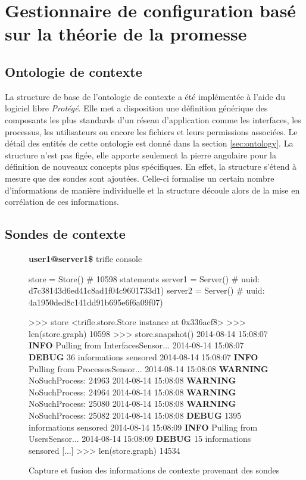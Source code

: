 \section{Gestionnaire de configuration basé sur la théorie de la promesse}

\subsection{Ontologie de contexte}

La structure de base de l'ontologie de contexte a été implémentée à l'aide du
logiciel libre \emph{Protégé}. Elle met a disposition une définition générique
des composants les plus standards d'un réseau d'application comme les interfaces,
les processus, les utilisateurs ou encore les fichiers et leurs permissions
associées. Le détail des entités de cette ontologie est donné dans la section
\ref{sec:ontology}. La structure n'est pas figée, elle apporte seulement la
pierre angulaire pour la définition de nouveaux concepts plus spécifiques. En
effet, la structure s'étend à mesure que des sondes sont ajoutées.  Celle-ci
formalise un certain nombre d'informations de manière individuelle et la
structure découle alors de la mise en corrélation de ces informations.

\subsection{Sondes de contexte}

\begin{figure}[h]
    \scriptsize
    \begin{myverbatim}[commandchars=\\\{\},codes={\catcode`$=3\catcode`_=8}]
\textbf{user1@server1\$} trifle console

store   = Store()  # 10598 statements
server1 = Server() # uuid: d7c38143d6ed41c8ad1f04c9601733d1)
server2 = Server() # uuid: 4a1950ded8c141dd91b695e6f6a09f07)

>>> store
<trifle.store.Store instance at 0x336acf8>
>>> len(store.graph)
10598
>>> store.snapshot()
2014-08-14 15:08:07 \textbf{INFO} Pulling from InterfacesSensor...
2014-08-14 15:08:07 \textbf{DEBUG} 36 informations sensored
2014-08-14 15:08:07 \textbf{INFO} Pulling from ProcessesSensor...
2014-08-14 15:08:08 \textbf{WARNING} NoSuchProcess: 24963
2014-08-14 15:08:08 \textbf{WARNING} NoSuchProcess: 24964
2014-08-14 15:08:08 \textbf{WARNING} NoSuchProcess: 25080
2014-08-14 15:08:08 \textbf{WARNING} NoSuchProcess: 25082
2014-08-14 15:08:08 \textbf{DEBUG} 1395 informations sensored
2014-08-14 15:08:09 \textbf{INFO} Pulling from UsersSensor...
2014-08-14 15:08:09 \textbf{DEBUG} 15 informations sensored
[...]
>>> len(store.graph)
14534
    \end{myverbatim}
  \caption{Capture et fusion des informations de contexte provenant des sondes}
  \label{fig:sensor}
\end{figure}

